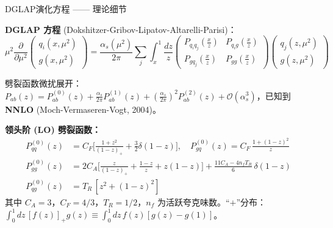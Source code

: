 \documentclass[10pt,aspectratio=169]{beamer}
\begin{document}
\begin{frame}{DGLAP演化方程 —— 理论细节}

  \textbf{DGLAP 方程} (Dokshitzer-Gribov-Lipatov-Altarelli-Parisi)：
  \begin{equation}
    \boxed{
      \mu^2 \frac{\partial}{\partial \mu^2}
      \begin{pmatrix} q_i(x,\mu^2) \\ g(x,\mu^2) \end{pmatrix}
      = \frac{\alpha_s(\mu^2)}{2\pi}
      \sum_{j} \int_x^1 \frac{dz}{z}
      \begin{pmatrix}
        P_{q_i q_j}(\frac{x}{z}) & P_{q_i g}(\frac{x}{z}) \\[4pt]
        P_{g q_j}(\frac{x}{z})  & P_{g g}(\frac{x}{z})
      \end{pmatrix}
      \begin{pmatrix} q_j(z,\mu^2) \\ g(z,\mu^2) \end{pmatrix}
    }
  \end{equation}

  劈裂函数微扰展开：$P_{ab}(z) = P_{ab}^{(0)}(z) + \frac{\alpha_s}{2\pi} P_{ab}^{(1)}(z)
  + (\frac{\alpha_s}{2\pi})^2 P_{ab}^{(2)}(z) + \mathcal{O}(\alpha_s^3)$，已知到 \textbf{NNLO} (Moch-Vermaseren-Vogt, 2004)。

  \textbf{领头阶 (LO) 劈裂函数：}
  {\small
  \begin{align*}
    P_{qq}^{(0)}(z) &= C_F \Big[ \frac{1+z^2}{(1-z)_+} + \frac{3}{2}\delta(1-z) \Big],\quad
    P_{gq}^{(0)}(z) = C_F\, \frac{1+(1-z)^2}{z} \\
    P_{gg}^{(0)}(z) &= 2C_A \Big[ \frac{z}{(1-z)_+} + \frac{1-z}{z} + z(1-z) \Big]
                       + \frac{11C_A - 4n_f T_R}{6}\,\delta(1-z) \\
    P_{qg}^{(0)}(z) &= T_R\,[z^2 + (1-z)^2]
  \end{align*}}
  其中 $C_A=3$，$C_F=4/3$，$T_R=1/2$，$n_f$ 为活跃夸克味数。``$+$''分布：
  $\int_0^1 dz\,[f(z)]_+ g(z) \equiv \int_0^1 dz\,f(z)[g(z)-g(1)]$。\vspace{-10pt}
\end{frame}
\end{document}

